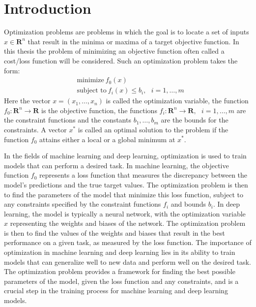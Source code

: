 \section{Introduction}\label{intro}

Optimization problems are problems in which the goal is to locate a set of inputs $x \in \mathbf{R}^{n}$ that result in the minima or maxima of a target objective function. In this thesis the problem of minimizing an objective function often called a cost/loss function will be considered. Such an optimization problem takes the form:
\begin{equation*}\label{eq:1}\tag{1.1}
\begin{aligned}
    &\text{minimize} \ f_{0}(x) \\
    &\text{subject to} \ f_{i}(x) \leq b_{i}, \text{  } i=1,\ldots,m 
\end{aligned}
\end{equation*}
Here the vector $x=(x_{1},\ldots,x_{n})$ is called the optimization variable, the function $f_{0}: \mathbf{R}^{n} \longrightarrow \mathbf{R}$ is the objective function, the functions $f_{i}: \mathbf{R}^{n} \longrightarrow \mathbf{R}, \text{  }i=1,\ldots,m$ are the constraint functions and the constants $b_{1},\ldots,b_{m}$ are the bounds for the constraints. A vector $x^{*}$ is called an optimal solution to the problem if the function $f_{0}$ attains either a local or a global minimum at $x^{*}$. 

In the fields of machine learning and deep learning, optimization is used to train models that can perform a desired task. In machine learning, the objective function $f_0$ represents a loss function that measures the discrepancy between the model's predictions and the true target values. The optimization problem is then to find the parameters of the model that minimize this loss function, subject to any constraints specified by the constraint functions $f_i$ and bounds $b_i$. In deep learning, the model is typically a neural network, with the optimization variable $x$ representing the weights and biases of the network. The optimization problem is then to find the values of the weights and biases that result in the best performance on a given task, as measured by the loss function. The importance of optimization in machine learning and deep learning lies in its ability to train models that can generalize well to new data and perform well on the desired task. The optimization problem provides a framework for finding the best possible parameters of the model, given the loss function and any constraints, and is a crucial step in the training process for machine learning and deep learning models.     

